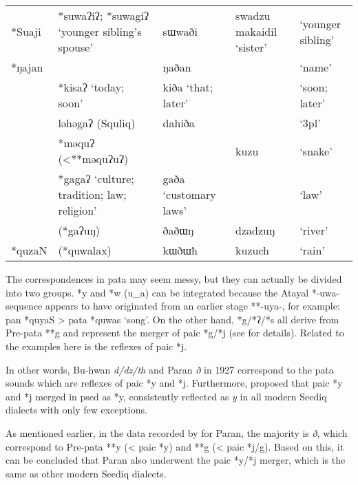 \begin{longtable}[c]{l>{\raggedright}p{2.7cm}>{\raggedright}p{2.7cm}>{\raggedright}p{2.7cm}l}
*Suaji & *suwaʔiʔ; *suwagiʔ `younger sibling's spouse' & sɯwaði                           & swadzu makaidil `sister' & `younger sibling' \\
*ŋajan   &                      & ŋaðan              &                     & `name'            \\
         & *kisaʔ `today; soon' & kiða `that; later' &                     & `soon; later'     \\
         & ləhəgaʔ (Squliq)     & dahiða             &                     & `3\acs{pl}'       \\
         & *məquʔ (<**məquʔuʔ)  &                    & kuzu                & `snake'           \\
       & *gagaʔ `culture; tradition; law; religion'    & gaða `customary laws'            &                          & `law'             \\ \hdashline
         & (*gaʔuŋ)             & ðaðɯŋ              & dzadzuŋ             & `river'           \\
*quzaN   & (*quwalax)           & kɯðɯħ              & kuzuch              & `rain'            \\ \hline
\end{longtable}  
\endgroup

The correspondences in \acl{pata} may seem messy, but they can actually be divided into two groups. *y and *w (u\_a) can be integrated because the Atayal *-uwa- sequence appears to have originated from an earlier stage **-uya-, for example: \ac{pan} *quyaS > \ac{pata} *quwas `song'. On the other hand, *g/*ʔ/*s all derive from Pre-\acl{pata} **g and represent the merger of \acl{paic} *g/*j (see \cite{song2023Aicgprime} for details). Related to the examples here is the reflexes of \acl{paic} *j.

In other words, Bu-hwan \textit{d/dz/th} and Paran \textit{ð} in 1927 correspond to the \acl{pata} sounds which are reflexes of \acl{paic} *y and *j. Furthermore, \textcite{song2023Aicgprime} proposed that \acl{paic} *y and *j merged in \acl{psed} as *y, consistently reflected as \textit{y} in all modern Seediq dialects with only few exceptions.

As mentioned earlier, in the data recorded by \textcite{asai1953sedik} for Paran, the majority is \textit{ð}, which correspond to Pre-\acl{pata} **y (< \ac{paic} *y) and **g (< \ac{paic} *j/g). Based on this, it can be concluded that Paran also underwent the \acl{paic} *y/*j merger, which is the same as other modern Seediq dialects. 

